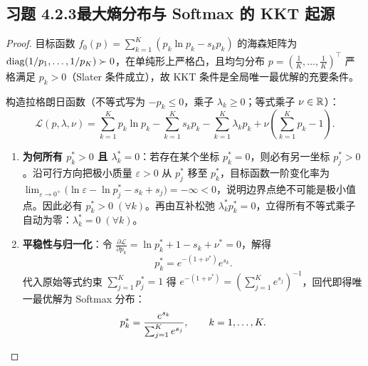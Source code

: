 \subsection*{习题 4.2.3\quad 最大熵分布与 Softmax 的 KKT 起源}
\begin{proof}
目标函数 $f_0(p) = \sum_{k=1}^K (p_k \ln p_k - s_k p_k)$ 的海森矩阵为 $\operatorname{diag}(1/p_1, \dots, 1/p_K) \succ 0$，在单纯形上严格凸，且均匀分布 $p = (\frac{1}{K}, \dots, \frac{1}{K})^\top$ 严格满足 $p_k > 0$（Slater 条件成立），故 KKT 条件是全局唯一最优解的充要条件。

构造拉格朗日函数（不等式写为 $-p_k \le 0$，乘子 $\lambda_k \ge 0$；等式乘子 $\nu \in \mathbb{R}$）：
\[
  \mathcal{L}(p, \lambda, \nu) = \sum_{k=1}^K p_k \ln p_k - \sum_{k=1}^K s_k p_k - \sum_{k=1}^K \lambda_k p_k + \nu\!\left(\sum_{k=1}^K p_k - 1\right).
\]
\begin{enumerate}[label=(\arabic*), leftmargin=1.8em]
  \item \textbf{为何所有 $p_k^* > 0$ 且 $\lambda_k^* = 0$}：若存在某个坐标 $p_k^* = 0$，则必有另一坐标 $p_j^* > 0$。沿可行方向把极小质量 $\varepsilon > 0$ 从 $p_j^*$ 移至 $p_k^*$，目标函数一阶变化率为 $\lim_{\varepsilon\to 0^+}\big(\ln\varepsilon - \ln p_j^* - s_k + s_j\big) = -\infty < 0$，说明边界点绝不可能是极小值点。因此必有 $p_k^* > 0\;(\forall k)$。再由互补松弛 $\lambda_k^* p_k^* = 0$，立得所有不等式乘子自动为零：$\lambda_k^* = 0\;(\forall k)$。
  \item \textbf{平稳性与归一化}：令 $\frac{\partial \mathcal{L}}{\partial p_k} = \ln p_k^* + 1 - s_k + \nu^* = 0$，解得
  \[
    p_k^* = e^{-(1+\nu^*)} e^{s_k}.
  \]
  代入原始等式约束 $\sum_{j=1}^K p_j^* = 1$ 得 $e^{-(1+\nu^*)} = \left(\sum_{j=1}^K e^{s_j}\right)^{-1}$，回代即得唯一最优解为 Softmax 分布：
  \[
    p_k^* = \frac{e^{s_k}}{\sum_{j=1}^K e^{s_j}}, \qquad k = 1, \dots, K. \qedhere
  \]
\end{enumerate}
\end{proof}


